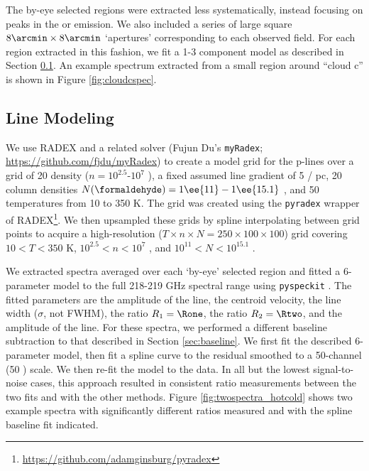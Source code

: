 The by-eye selected regions were extracted less systematically, instead
focusing on peaks in the \threeohthree or \threetwoone emission.  We also
included a series of large square $8\arcmin \times 8\arcmin$ `apertures'
corresponding to each observed field.  For each region extracted in this
fashion, we fit a 1-3 component model as described in Section
\ref{sec:linemodeling}.  An example spectrum extracted from a small region
around ``cloud c'' is shown in Figure \ref{fig:cloudcspec}.


\subsection{Line Modeling}
\label{sec:linemodeling}
%
We use RADEX \citet{van-Der-Tak2007a} and a related solver (Fujun Du's
\texttt{myRadex}; \url{https://github.com/fjdu/myRadex}) to create a model grid
for the p-\formaldehyde lines over a grid of 20 density ($n=10^{2.5}$-$10^{7}$
\percc), a fixed assumed line gradient of 5 \kms / pc, 20 \formaldehyde column
densities $N(\formaldehyde) = 1\ee{11}-1\ee{15.1}$ \persc, and 50 temperatures
from 10 to 350 K.  The grid was created using the \texttt{pyradex} wrapper of
RADEX\footnote{\url{https://github.com/adamginsburg/pyradex}}.  We then
upsampled these grids by spline interpolating between grid points to acquire a
high-resolution ($T\times n \times N = 250\times100\times100$) grid covering
$10<T<350$ K, $10^{2.5} < n < 10^7$ \percc, and $10^{11} < N < 10^{15.1}$
\persc\perkmspc.

We extracted spectra averaged over each `by-eye' selected region and fitted
a 6-parameter model to the full 218-219 GHz spectral range using
\texttt{pyspeckit} \citep{Ginsburg2011c}.  The fitted parameters are the amplitude of the
\formaldehyde \threeohthree line, the centroid velocity, the line width
($\sigma$, not FWHM), the ratio $R_1 = \Rone$, the ratio $R_2 = \Rtwo$, and the
amplitude of the \methanol \fourtwotwo line.  For these spectra, we performed
a different baseline subtraction to that described in Section
\ref{sec:baseline}.  We first fit the described 6-parameter model, then fit a
spline curve to the residual smoothed to a 50-channel (50 \kms) scale.  We then
re-fit the model to the data.  In all but the lowest signal-to-noise cases,
this approach resulted in consistent ratio measurements between the two fits
and with the other methods.  Figure \ref{fig:twospectra_hotcold} shows two example
spectra with significantly different ratios measured and with the spline baseline
fit indicated.

